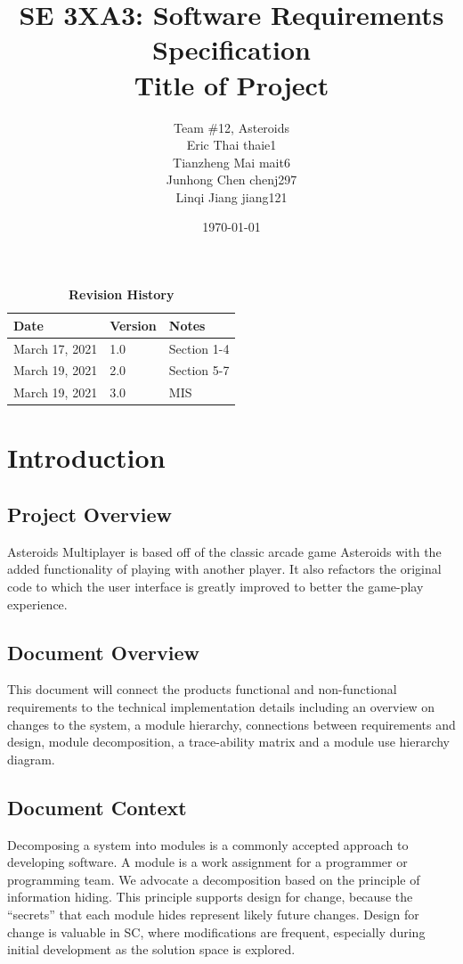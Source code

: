 \documentclass[12pt, titlepage]{article}
\title{SE 3XA3: Software Requirements Specification\\Title of Project}
\author{Team \#12, Asteroids
		\\ Eric Thai thaie1
		\\ Tianzheng Mai mait6
		\\ Junhong Chen chenj297
		\\ Linqi Jiang jiang121
}
\date{\today}
\begin{document}
\begin{table}[bp]
\centering
\caption{\bf Revision History}
\begin{tabularx}{\textwidth}{p{3cm}p{2cm}X}
\toprule {\bf Date} & {\bf Version} & {\bf Notes}\\
\midrule
March 17, 2021 & 1.0 & Section 1-4\\
March 19, 2021 & 2.0 & Section 5-7\\
March 19, 2021 & 3.0 & MIS\\
\bottomrule
\end{tabularx}
\end{table}


\maketitle

\tableofcontents
\listoftables
\listoffigures


\newpage


\section{Introduction}
\subsection{Project Overview} \label{SecAchange}
Asteroids Multiplayer is based off of the classic arcade game Asteroids with the added functionality of playing with another player. It also refactors the original code to which the user interface is greatly improved to better the game-play experience. 
\subsection{Document Overview} \label{SecAchange}
This document will connect the products functional and non-functional requirements to the technical implementation details including an overview on changes to the system, a module hierarchy, connections between requirements and design, module decomposition, a trace-ability matrix and a module use hierarchy diagram.
\subsection{Document Context} \label{SecAchange}

Decomposing a system into modules is a commonly accepted approach to developing
software.  A module is a work assignment for a programmer or programming
team.  We advocate a decomposition
based on the principle of information hiding.  This
principle supports design for change, because the ``secrets'' that each module
hides represent likely future changes.  Design for change is valuable in SC,
where modifications are frequent, especially during initial development as the
solution space is explored.  
\end{document}
